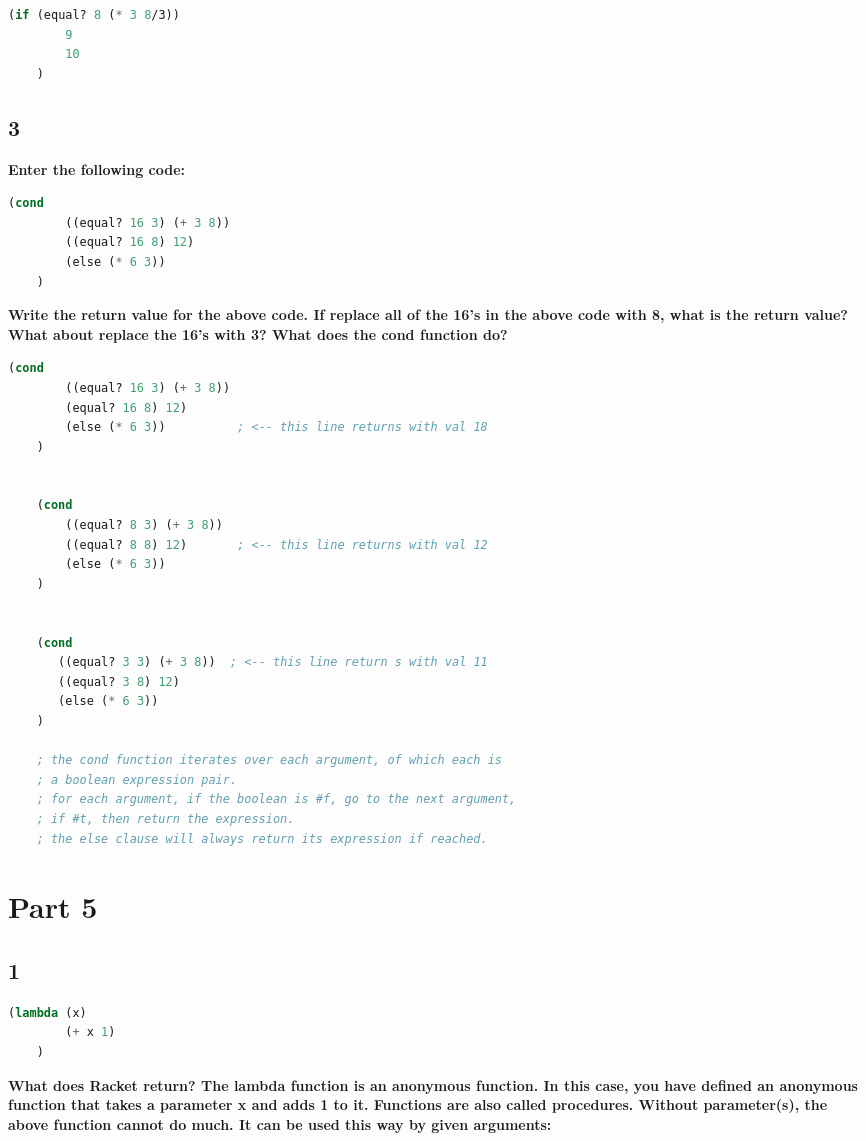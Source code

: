 \documentclass{article}
\begin{document}
\begin{lstlisting}[language=lisp,style=redStyle]
    (if (equal? 8 (* 3 8/3))
        9
        10
    )
\end{lstlisting}

\subsection*{3}
\begin{adjustwidth}{2em}{0em}
    \textbf{Enter the following code: }
\end{adjustwidth}
\begin{lstlisting}[language=lisp]
    (cond 
        ((equal? 16 3) (+ 3 8)) 
        ((equal? 16 8) 12) 
        (else (* 6 3))
    ) 
\end{lstlisting}
\begin{adjustwidth}{2em}{0em}
    \textbf{Write the return value for the above code. If replace all of the 16's in the above code with 8, what is the return value? What about replace the 16’s with 3? What does the cond function do? }
\end{adjustwidth}

\begin{lstlisting}[language=lisp,style=redStyle]
    (cond 
        ((equal? 16 3) (+ 3 8)) 
        (equal? 16 8) 12) 
        (else (* 6 3))          ; <-- this line returns with val 18
    ) 


    (cond 
        ((equal? 8 3) (+ 3 8)) 
        ((equal? 8 8) 12)       ; <-- this line returns with val 12
        (else (* 6 3))
    ) 


    (cond 
       ((equal? 3 3) (+ 3 8))  ; <-- this line return s with val 11
       ((equal? 3 8) 12) 
       (else (* 6 3))
    ) 

    ; the cond function iterates over each argument, of which each is 
    ; a boolean expression pair.
    ; for each argument, if the boolean is #f, go to the next argument, 
    ; if #t, then return the expression.
    ; the else clause will always return its expression if reached.
\end{lstlisting}

\section*{Part 5}
\subsection*{1}
\begin{lstlisting}[language=lisp]
    (lambda (x) 
        (+ x 1)
    ) 
\end{lstlisting}
\begin{adjustwidth}{2em}{0em}
    \textbf{What does Racket return? The lambda function is an anonymous function. In this case, you have defined an anonymous function that takes a parameter x and adds 1 to it. Functions are also called procedures. Without parameter(s), the above function cannot do much. It can be used this way by given arguments: }
\end{adjustwidth}
\end{document}
